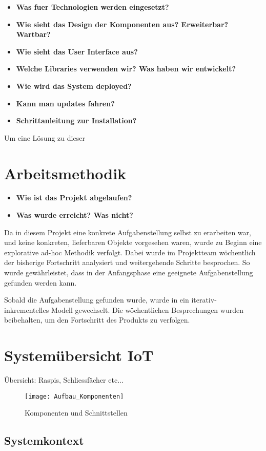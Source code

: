 \begin{itemize}
    \item \textbf{ Was fuer Technologien werden eingesetzt?} 
    \item \textbf{ Wie sieht das Design der Komponenten aus? Erweiterbar? Wartbar?} 
    \item \textbf{ Wie sieht das User Interface aus?} 
    \item \textbf{ Welche Libraries verwenden wir? Was haben wir entwickelt?}
    \item \textbf{ Wie wird das System deployed?}
    \item \textbf{ Kann man updates fahren?}
    \item \textbf{ Schrittanleitung zur Installation?}
\end{itemize}
    
    
Um eine Lösung zu dieser 

\section{Arbeitsmethodik}
\begin{itemize}
    \item \textbf{Wie ist das Projekt abgelaufen?}
    \item \textbf{Was wurde erreicht? Was nicht?}
\end{itemize}
Da in diesem Projekt eine konkrete Aufgabenstellung selbst zu erarbeiten war, und keine konkreten, lieferbaren Objekte vorgesehen waren, wurde zu Beginn eine explorative ad-hoc Methodik verfolgt. Dabei wurde im Projektteam wöchentlich der bisherige Fortschritt analysiert und weitergehende Schritte besprochen. So wurde gewährleistet, dass in der Anfangsphase eine geeignete Aufgabenstellung gefunden werden kann.
\par
Sobald die Aufgabenstellung gefunden wurde, wurde in ein iterativ- inkrementelles Modell gewechselt. Die wöchentlichen Besprechungen wurden beibehalten, um den Fortschritt des Produkts zu verfolgen.

\section{Systemübersicht IoT}
\label{sec:Setup_IoT}
Übersicht: Raspis, Schliessfächer etc...
\begin{figure}
\centering
\texttt{[image: Aufbau\_Komponenten]}
\caption{Komponenten und Schnittstellen}
\label{fig:Aufbau Komponenten}
\end{figure}
\subsection{Systemkontext}

